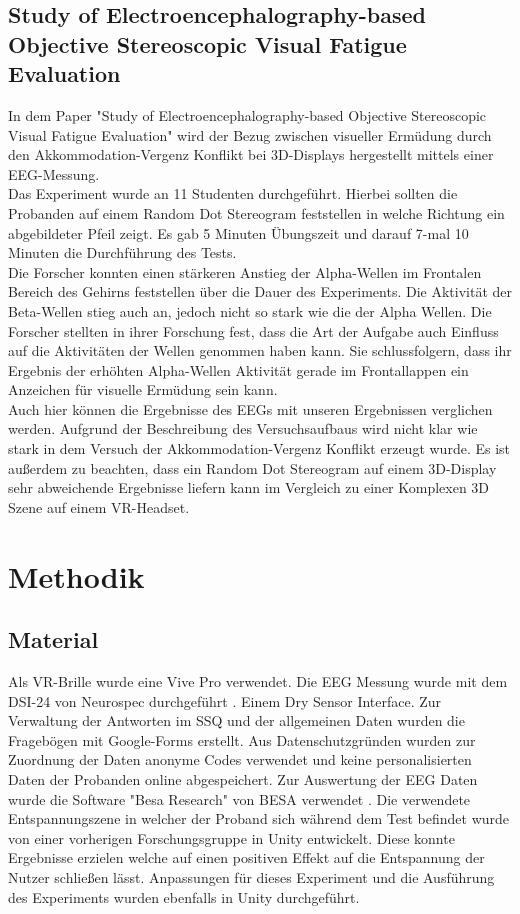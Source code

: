 \documentclass[conference]{IEEEtran}
\begin{document}
\subsection{Study of Electroencephalography-based Objective Stereoscopic Visual Fatigue Evaluation}
In dem Paper "Study of Electroencephalography-based Objective Stereoscopic Visual Fatigue Evaluation" \cite{b5} wird der Bezug zwischen visueller Ermüdung durch den Akkommodation-Vergenz Konflikt bei 3D-Displays hergestellt mittels einer EEG-Messung.\\
Das Experiment wurde an 11 Studenten durchgeführt. Hierbei sollten die Probanden auf einem Random Dot Stereogram feststellen in welche Richtung ein abgebildeter Pfeil zeigt. Es gab 5 Minuten Übungszeit und darauf 7-mal 10 Minuten die Durchführung des Tests.\\
Die Forscher konnten einen stärkeren Anstieg der Alpha-Wellen im Frontalen Bereich des Gehirns feststellen über die Dauer des Experiments. Die Aktivität der Beta-Wellen stieg auch an, jedoch nicht so stark wie die der Alpha Wellen. Die Forscher stellten in ihrer Forschung fest, dass die Art der Aufgabe auch Einfluss auf die Aktivitäten der Wellen genommen haben kann. Sie schlussfolgern, dass ihr Ergebnis der erhöhten Alpha-Wellen Aktivität gerade im Frontallappen ein Anzeichen für visuelle Ermüdung sein kann.\\
Auch hier können die Ergebnisse des EEGs mit unseren Ergebnissen verglichen werden. Aufgrund der Beschreibung des Versuchsaufbaus wird nicht klar wie stark in dem Versuch der Akkommodation-Vergenz Konflikt erzeugt wurde. Es ist außerdem zu beachten, dass ein Random Dot Stereogram auf einem 3D-Display sehr abweichende Ergebnisse liefern kann im Vergleich zu einer Komplexen 3D Szene auf einem VR-Headset.
 

\section{Methodik}
\subsection{Material}
Als VR-Brille wurde eine Vive Pro \cite{b11} verwendet. Die EEG Messung wurde mit dem DSI-24 von Neurospec durchgeführt \cite{b9}. Einem Dry Sensor Interface. Zur Verwaltung der Antworten im SSQ und der allgemeinen Daten wurden die Fragebögen mit Google-Forms erstellt. Aus Datenschutzgründen wurden zur Zuordnung der Daten anonyme Codes verwendet und keine personalisierten Daten der Probanden online abgespeichert. Zur Auswertung der EEG Daten wurde die Software "Besa Research" von BESA verwendet \cite{b10}. Die verwendete Entspannungszene in welcher der Proband sich während dem Test befindet wurde von einer vorherigen Forschungsgruppe in Unity entwickelt. Diese konnte Ergebnisse erzielen welche auf einen positiven Effekt auf die Entspannung der Nutzer schließen lässt. Anpassungen für dieses Experiment und die Ausführung des Experiments wurden ebenfalls in Unity durchgeführt.
\end{document}
